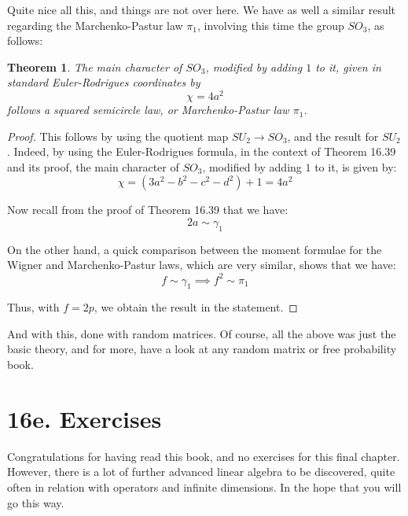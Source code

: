 \documentclass[12pt]{amsbook}
\newtheorem{theorem}{Theorem}[chapter]
\begin{document}
Quite nice all this, and things are not over here. We have as well a similar result regarding the Marchenko-Pastur law $\pi_1$, involving this time the group $SO_3$, as follows:

\begin{theorem}
The main character of $SO_3$, modified by adding $1$ to it, given in standard Euler-Rodrigues coordinates by
$$\chi=4a^2$$
follows a squared semicircle law, or Marchenko-Pastur law $\pi_1$.
\end{theorem}

\begin{proof}
This follows by using the quotient map $SU_2\to SO_3$, and the result for $SU_2$. Indeed, by using the Euler-Rodrigues formula, in the context of Theorem 16.39 and its proof, the main character of $SO_3$, modified by adding $1$ to it, is given by:
$$\chi=(3a^2-b^2-c^2-d^2)+1=4a^2$$

Now recall from the proof of Theorem 16.39 that we have:
$$2a\sim\gamma_1$$

On the other hand, a quick comparison between the moment formulae for the Wigner and Marchenko-Pastur laws, which are very similar, shows that we have:
$$f\sim\gamma_1\implies f^2\sim\pi_1$$

Thus, with $f=2p$, we obtain the result in the statement.
\end{proof}

And with this, done with random matrices. Of course, all the above was just the basic theory, and for more, have a look at any random matrix or free probability book.

\section*{16e. Exercises}

Congratulations for having read this book, and no exercises for this final chapter. However, there is a lot of further advanced linear algebra to be discovered, quite often in relation with operators and infinite dimensions. In the hope that you will go this way.
\end{document}
